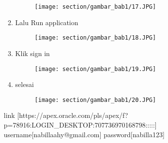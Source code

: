 \begin{enumerate}
\begin{enumerate}
\begin{figure}[!htbp]
    \texttt{[image: section/gambar\_bab1/17.JPG]}
    \label{penanda}
\end{figure}
\vspace{16cm}
    \item Lalu Run application
\begin{figure}[!htbp]
    \centering
    \texttt{[image: section/gambar\_bab1/18.JPG]}
    \label{penanda}
\end{figure}
\vspace{10cm}
    \item Klik sign in
\begin{figure}[!htbp]
    \centering
    \texttt{[image: section/gambar\_bab1/19.JPG]}
    \label{penanda}
\end{figure}
\vspace{10cm}
    \item selesai
\begin{figure}[!htbp]
    \centering
    \texttt{[image: section/gambar\_bab1/20.JPG]}
    \label{penanda}
\end{figure}
\end{enumerate}
link [https://apex.oracle.com/pls/apex/f?p=78916:LOGIN_DESKTOP:707736970168798:::::] 
username[nabillaahy@gmail.com] password[nabilla123]

\end{enumerate}